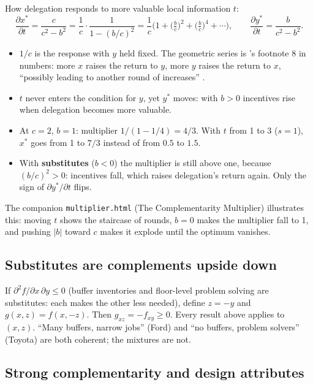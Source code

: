 How delegation responds to more valuable local information $t$:
\[
  \frac{\partial x^*}{\partial t} = \frac{c}{c^2 - b^2} = \frac{1}{c} \cdot \frac{1}{1 - (b/c)^2}
  = \frac{1}{c}\Big(1 + \big(\tfrac{b}{c}\big)^2 + \big(\tfrac{b}{c}\big)^4 + \cdots\Big), \qquad
  \frac{\partial y^*}{\partial t} = \frac{b}{c^2 - b^2}.
\]

\begin{itemize}
  \item $1/c$ is the response with $y$ held fixed. The geometric series is \MR's footnote 8 in
    numbers: more $x$ raises the return to $y$, more $y$ raises the return to $x$, ``possibly
    leading to another round of increases'' .
  \item $t$ never enters the condition for $y$, yet $y^*$ moves: with $b > 0$ incentives rise when
    delegation becomes more valuable.
  \item At $c = 2$, $b = 1$: multiplier $1/(1 - 1/4) = 4/3$. With $t$ from 1 to 3 ($s = 1$), $x^*$
    goes from 1 to $7/3$ instead of from $0.5$ to $1.5$.
  \item With \textbf{substitutes} ($b < 0$) the multiplier is still above one, because
    $(b/c)^2 > 0$: incentives fall, which raises delegation's return again. Only the sign of
    $\partial y^*/\partial t$ flips.
\end{itemize}

\begin{keyidea}
The companion \texttt{multiplier.html} (The Complementarity Multiplier) illustrates this: moving $t$
shows the staircase of rounds, $b = 0$ makes the multiplier fall to 1, and pushing $|b|$ toward $c$
makes it explode until the optimum vanishes.
\end{keyidea}

\subsection{Substitutes are complements upside down}\label{sec:a1-subs}

If $\partial^2 f/\partial x\,\partial y \le 0$ (buffer inventories and floor-level problem solving
are substitutes: each makes the other less needed), define $z = -y$ and $g(x, z) = f(x, -z)$. Then
$g_{xz} = -f_{xy} \ge 0$. Every result above applies to $(x, z)$. ``Many buffers, narrow jobs''
(Ford) and ``no buffers, problem solvers'' (Toyota) are both coherent; the mixtures are not.

\subsection{Strong complementarity and design attributes }\label{sec:a1-strong}

